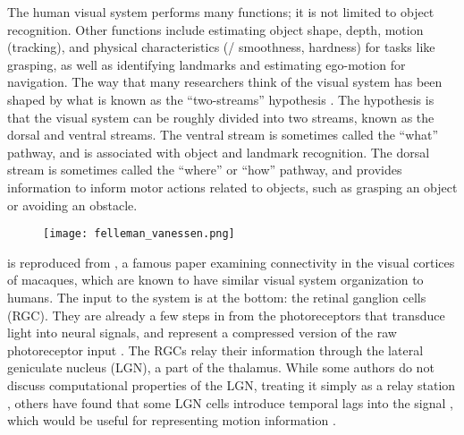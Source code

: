 The human visual system performs many functions;
it is not limited to object recognition.
Other functions include estimating object shape, depth, motion (tracking),
and physical characteristics (\eg/ smoothness, hardness) for tasks like grasping,
as well as identifying landmarks and estimating ego-motion for navigation.
The way that many researchers think of the visual system
has been shaped by what is known as the ``two-streams'' hypothesis \parencite{Goodale1992}.
The hypothesis is that the visual system can be roughly divided
into two streams, known as the dorsal and ventral streams.
The ventral stream is sometimes called the ``what'' pathway,
and is associated with object and landmark recognition.
The dorsal stream is sometimes called the ``where'' or ``how'' pathway,
and provides information to inform motor actions related to objects,
such as grasping an object or avoiding an obstacle.


\begin{figure}
  \centering
  \texttt{[image: felleman\_vanessen.png]}
\end{figure}

 is reproduced from \textcite{Felleman1991},
a famous paper examining connectivity in the visual cortices of macaques,
which are known to have similar visual system organization to humans.
The input to the system is at the bottom: the retinal ganglion cells (RGC).
They are already a few steps in from the photoreceptors that transduce
light into neural signals,
and represent a compressed version of the raw photoreceptor input \parencite{Nassi2009}.
The RGCs relay their information through the lateral geniculate nucleus (LGN),
a part of the thalamus.
While some authors do not discuss computational properties of the LGN,
treating it simply as a relay station \parencite[\eg/][]{Nassi2009},
others have found that some LGN cells introduce temporal lags into the signal \parencite{Vigeland2013},
which would be useful for representing motion information \parencite{Adelson1985}.


